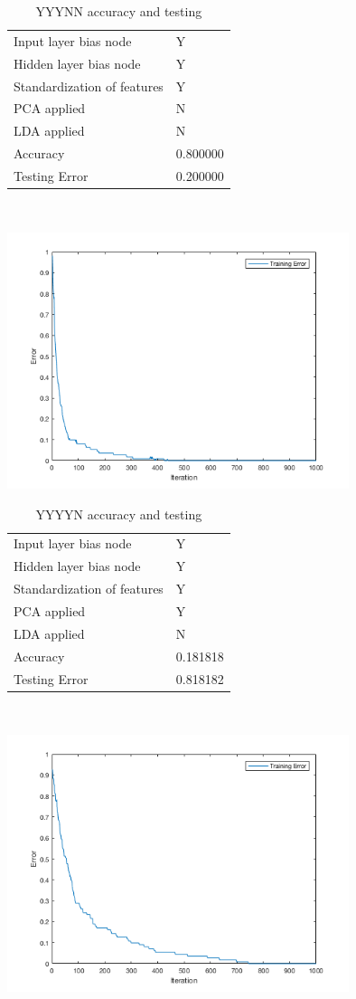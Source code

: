 \documentclass[12pt]{article}
\newcommand{\accuracyAndTestErrorTable}[8]{
  \begin{tabular}{l|l}
    \hline
    Input layer bias node & #1 \\
    Hidden layer bias node & #2 \\
    Standardization of features & #3 \\
    PCA applied & #4 \\
    LDA applied & #5 \\
    \hline
    Accuracy & #6 \\
    Testing Error & #7 \\
    \hline
  \end{tabular}
  ~\\[60pt]
  \caption{#8}
}
\begin{document}


\begin{center}
  \begin{table}[H]
    \begin{varwidth}[b]{0.4\linewidth}
      \centering
      \accuracyAndTestErrorTable{Y}{Y}{Y}{N}{N}{0.800000}{0.200000}{YYYNN accuracy and testing}
      \label{table:YYYNN}
    \end{varwidth}%
    \hfill
    \begin{minipage}[b]{0.6\linewidth}
      \centering
      \includegraphics[width=100mm]{YYYNN_training_error.png}
      \label{fig:YYYNN}
    \end{minipage}
  \end{table}
\end{center}


\begin{center}
  \begin{table}[H]
    \begin{varwidth}[b]{0.4\linewidth}
      \centering
      \accuracyAndTestErrorTable{Y}{Y}{Y}{Y}{N}{0.181818}{0.818182}{YYYYN accuracy and testing}
      \label{table:YYYYN}
    \end{varwidth}%
    \hfill
    \begin{minipage}[b]{0.6\linewidth}
      \centering
      \includegraphics[width=100mm]{YYYYN_training_error.png}
      \label{fig:YYYYN}
    \end{minipage}
  \end{table}
\end{center}
\end{document}
